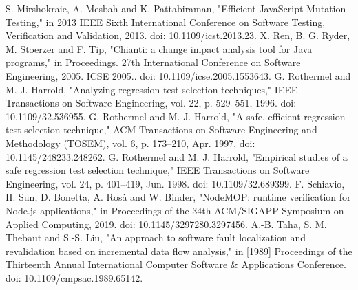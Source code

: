 \documentclass[10pt, conference]{IEEEtran}
\begin{document}
\begin{thebibliography}{00}
 S. Mirshokraie, A. Mesbah and K. Pattabiraman, "Efficient JavaScript Mutation Testing," in 2013 IEEE Sixth International Conference on Software Testing, Verification and Validation, 2013. doi: 10.1109/icst.2013.23.
 X. Ren, B. G. Ryder, M. Stoerzer and F. Tip, "Chianti: a change impact analysis tool for Java programs," in Proceedings. 27th International Conference on Software Engineering, 2005. ICSE 2005.. doi: 10.1109/icse.2005.1553643.
 G. Rothermel and M. J. Harrold, "Analyzing regression test selection techniques," IEEE Transactions on Software Engineering, vol. 22, p. 529–551, 1996. doi: 10.1109/32.536955.
 G. Rothermel and M. J. Harrold, "A safe, efficient regression test selection technique," ACM Transactions on Software Engineering and Methodology (TOSEM), vol. 6, p. 173–210, Apr. 1997. doi: 10.1145/248233.248262.
 G. Rothermel and M. J. Harrold, "Empirical studies of a safe regression test selection technique," IEEE Transactions on Software Engineering, vol. 24, p. 401–419, Jun. 1998. doi: 10.1109/32.689399.
 F. Schiavio, H. Sun, D. Bonetta, A. Rosà and W. Binder, "NodeMOP: runtime verification for Node.js applications," in Proceedings of the 34th ACM/SIGAPP Symposium on Applied Computing, 2019. doi: 10.1145/3297280.3297456.
 A.-B. Taha, S. M. Thebaut and S.-S. Liu, "An approach to software fault localization and revalidation based on incremental data flow analysis," in [1989] Proceedings of the Thirteenth Annual International Computer Software \& Applications Conference. doi: 10.1109/cmpsac.1989.65142.
\end{thebibliography}
\vspace{12pt}
\end{document}
